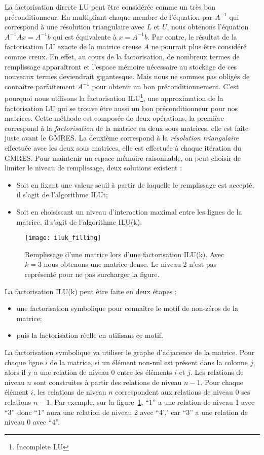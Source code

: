 La factorisation directe LU peut être considérée comme un très bon préconditionneur.
%
En multipliant chaque membre de l'équation par $A^{-1}$ qui correspond à une résolution triangulaire avec $L$ et $U$, nous obtenons l'équation $A^{-1}Ax=A^{-1}b$ qui est équivalente à $x=A^{-1}b$.
%
Par contre, le résultat de la factorisation LU exacte de la matrice creuse $A$ ne pourrait plus être considéré comme creux.
%
En effet, au cours de la factorisation, de nombreux termes de remplissage apparaîtront et l'espace mémoire nécessaire au stockage de ces nouveaux termes deviendrait gigantesque.
%
Mais nous ne sommes pas obligés de connaître parfaitement $A^{-1}$ pour obtenir un bon préconditionnement.
%
C'est pourquoi nous utilisons la factorisation ILU\footnote{Incomplete LU}, une approximation de la factorisation LU qui se trouve être aussi un bon préconditionneur pour nos matrices.
%
Cette méthode est composée de deux opérations, la première correspond à la {\em factorisation} de la matrice en deux sous matrices, elle est faite juste avant le GMRES.
%
La deuxième correspond à la {\em résolution triangulaire} effectuée avec les deux sous matrices, elle est effectuée à chaque itération du GMRES.
%
Pour maintenir un espace mémoire raisonnable, on peut choisir de limiter le niveau de remplissage, deux solutions existent :
\begin{itemize}
  \item Soit en fixant une valeur seuil à partir de laquelle le remplissage est accepté, il s'agit de l'algorithme ILUt;
  \item Soit en choisissant un niveau d'interaction maximal entre les lignes de la matrice, il s'agit de l'algorithme ILU(k).
\end{itemize}
\begin{figure}[!h]
  \centering
  \texttt{[image: iluk\_filling]}
  \caption{Remplissage d'une matrice lors d'une factorisation ILU(k). Avec $k=3$ nous obtenons une matrice dense. Le niveau 2 n'est pas représenté pour ne pas surcharger la figure.}
  \label{fig:iluk_filling}
\end{figure}

La factorisation ILU(k) peut être faite en deux étapes :
\begin{itemize}
  \item une factorisation symbolique pour connaître le motif de non-zéros de la matrice;
  \item puis la factorisation réelle en utilisant ce motif.
\end{itemize}
%
La factorisation symbolique va utiliser le graphe d'adjacence de la matrice.
%
Pour chaque ligne $i$ de la matrice, si un élément non-nul est présent dans la colonne $j$, alors il y a une relation de niveau 0 entre les éléments $i$ et $j$.
%
Les relations de niveau $n$ sont construites à partir des relations de niveau $n-1$.
%
Pour chaque élément $i$, les relations de niveau $n$ correspondent aux relations de niveau 0 ses relations $n-1$.
%
Par exemple, sur la figure~\ref{fig:iluk_filling}, ``1'' a une relation de niveau 1 avec ``3'' donc ``1'' aura une relation de niveau 2 avec ``4',' car ``3'' a une relation de niveau 0 avec ``4''.

